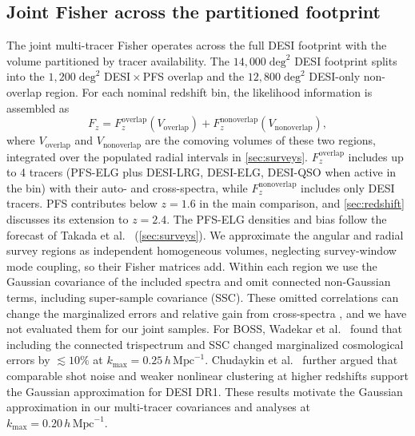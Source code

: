 \documentclass[a4paper,11pt]{article}
\newcommand{\revchange}[1]{{\color{RevisionColor}#1}}
\def\be{\begin{equation}}
\def\ee{\end{equation}}
\def\iMpch{\,h\,\mathrm{Mpc}^{-1}}
\def\kmax{k_{\mathrm{max}}}
\begin{document}
\subsection{Joint Fisher across the partitioned footprint}
\label{sec:joint_fisher}

The joint multi-tracer Fisher operates across the full DESI
footprint with the volume partitioned by tracer availability. The
$14{,}000\;\mathrm{deg}^2$ DESI footprint splits into the
$1{,}200\;\mathrm{deg}^2$ \revchange{DESI\,$\times$\,PFS} overlap and the
$12{,}800\;\mathrm{deg}^2$ DESI-only non-overlap region. \revchange{For each nominal
redshift bin, the likelihood information is assembled as}
\be
\label{eq:volume_partition}
F_z = F_z^{\mathrm{overlap}}(V_{\mathrm{overlap}})
    + F_z^{\mathrm{nonoverlap}}(V_{\mathrm{nonoverlap}}),
\ee
\revchange{where $V_{\mathrm{overlap}}$ and $V_{\mathrm{nonoverlap}}$ are the comoving
volumes of these two regions, integrated over the populated radial intervals
in \cref{sec:surveys}.}
$F_z^{\mathrm{overlap}}$ includes \revchange{up to} 4 tracers (PFS-ELG plus
DESI-LRG, DESI-ELG, DESI-QSO when active in the bin) with their
auto- and cross-spectra\revchange{, while} $F_z^{\mathrm{nonoverlap}}$ includes only DESI tracers.
\revchange{PFS contributes below $z=1.6$ in the main comparison, and
\cref{sec:redshift} discusses its extension to $z=2.4$. The PFS-ELG
densities and bias follow the forecast of Takada et al.~\cite{Takada:2014pfs}
(\cref{sec:surveys}).}
\revchange{We approximate the angular and radial survey regions as
independent homogeneous volumes, neglecting survey-window mode coupling,
so their Fisher matrices add.
Within each region we use the Gaussian covariance of the included spectra and omit connected non-Gaussian terms,
including super-sample covariance (SSC). These omitted correlations
can change the marginalized errors and relative gain from cross-spectra
\cite{Wadekar:2019rdu}, and we have not evaluated them for our joint samples.
For BOSS, Wadekar et al.~\cite{Wadekar:2020hax} found that including
the connected trispectrum and SSC changed marginalized cosmological
errors by $\lesssim10\%$ at $k_{\mathrm{max}}=0.25\iMpch$.
Chudaykin et al.~\cite{Chudaykin:2025aux} further argued that comparable shot
noise and weaker nonlinear clustering at higher redshifts support the
Gaussian approximation for DESI DR1.
These results motivate the Gaussian approximation in our multi-tracer covariances and analyses at $\kmax=0.20\iMpch$.}
\end{document}
